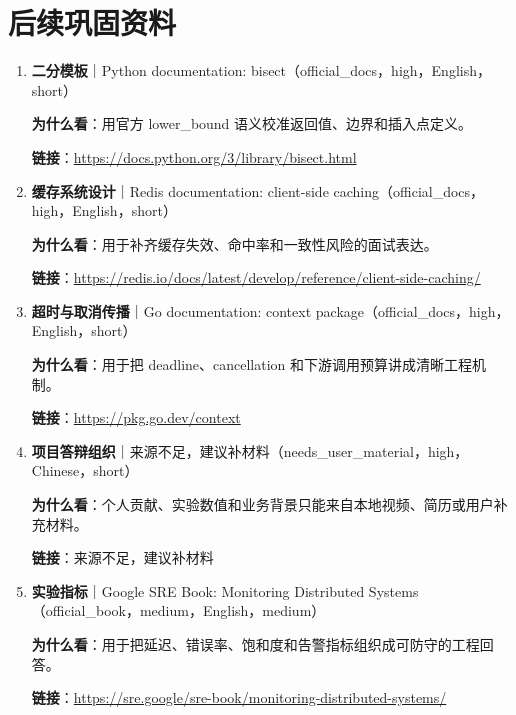 \documentclass[a4paper,11pt]{article}
\begin{document}
\section{后续巩固资料}
\begin{enumerate}
\item \textbf{二分模板}｜Python documentation: bisect（official\_docs，high，English，short）\par \textbf{为什么看}：用官方 lower\_bound 语义校准返回值、边界和插入点定义。\par \textbf{链接}：\url{https://docs.python.org/3/library/bisect.html}
\item \textbf{缓存系统设计}｜Redis documentation: client-side caching（official\_docs，high，English，short）\par \textbf{为什么看}：用于补齐缓存失效、命中率和一致性风险的面试表达。\par \textbf{链接}：\url{https://redis.io/docs/latest/develop/reference/client-side-caching/}
\item \textbf{超时与取消传播}｜Go documentation: context package（official\_docs，high，English，short）\par \textbf{为什么看}：用于把 deadline、cancellation 和下游调用预算讲成清晰工程机制。\par \textbf{链接}：\url{https://pkg.go.dev/context}
\item \textbf{项目答辩组织}｜来源不足，建议补材料（needs\_user\_material，high，Chinese，short）\par \textbf{为什么看}：个人贡献、实验数值和业务背景只能来自本地视频、简历或用户补充材料。\par \textbf{链接}：来源不足，建议补材料
\item \textbf{实验指标}｜Google SRE Book: Monitoring Distributed Systems（official\_book，medium，English，medium）\par \textbf{为什么看}：用于把延迟、错误率、饱和度和告警指标组织成可防守的工程回答。\par \textbf{链接}：\url{https://sre.google/sre-book/monitoring-distributed-systems/}
\end{enumerate}
\end{document}
